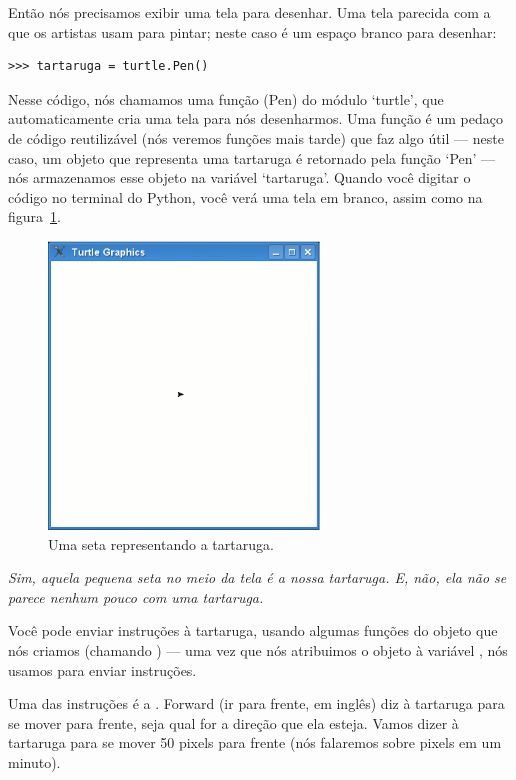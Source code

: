Então nós precisamos exibir uma tela para desenhar. Uma tela parecida com a que os artistas usam para pintar; neste caso é um espaço branco para desenhar:

\begin{listing}
\begin{verbatim}
>>> tartaruga = turtle.Pen()
\end{verbatim}
\end{listing}

Nesse código, nós chamamos uma função (Pen) do módulo `turtle', que automaticamente cria uma tela para nós desenharmos. Uma função é um pedaço de código reutilizável (nós veremos funções mais tarde) que faz algo útil --- neste caso, um objeto que representa uma tartaruga é retornado pela função `Pen' --- nós armazenamos esse objeto na variável `tartaruga'. Quando você digitar o código no terminal do Python, você verá uma tela em branco, assim como na figura~\ref{fig10}.

\begin{figure}
\begin{center}
\includegraphics[width=72mm]{eps/figure10.eps}
\end{center}
\caption{Uma seta representando a tartaruga.}\label{fig10}
\end{figure}

\emph{Sim, aquela pequena seta no meio da tela é a nossa tartaruga. E, não, ela não se parece nenhum pouco com uma tartaruga.}

Você pode enviar instruções à tartaruga, usando algumas funções do objeto que nós criamos (chamando ) --- uma vez que nós atribuimos o objeto à variável , nós usamos  para enviar instruções.

Uma das instruções é a . Forward (ir para frente, em inglês) diz à tartaruga para se mover para frente, seja qual for a direção que ela esteja. Vamos dizer à tartaruga para se mover 50 pixels para frente (nós falaremos sobre pixels em um minuto).

